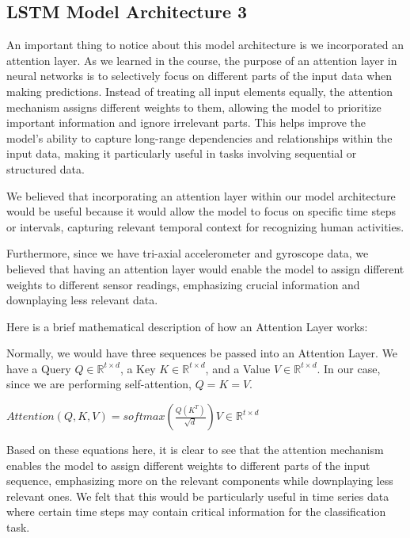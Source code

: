 \documentclass[11pt]{article}
\begin{document}
\subsection{LSTM Model Architecture 3}
An important thing to notice about this model architecture is we incorporated an attention layer. As we learned in the course, the purpose of an attention layer in neural networks is to selectively focus on different parts of the input data when making predictions. Instead of treating all input elements equally, the attention mechanism assigns different weights to them, allowing the model to prioritize important information and ignore irrelevant parts. This helps improve the model's ability to capture long-range dependencies and relationships within the input data, making it particularly useful in tasks involving sequential or structured data. \newline 

We believed that incorporating an attention layer within our model architecture would be useful because it would allow the model to focus on specific time steps or intervals, capturing relevant temporal context for recognizing human activities. \newline 

Furthermore, since we have tri-axial accelerometer and gyroscope data, we believed that having an attention layer would enable the model to assign different weights to different sensor readings, emphasizing crucial information and downplaying less relevant data. \newline 

Here is a brief mathematical description of how an Attention Layer works: \newline 

Normally, we would have three sequences be passed into an Attention Layer. We have a Query $Q \in \mathbb{R}^{t \times d}$, a Key $K \in \mathbb{R}^{t \times d}$, and a Value $V \in \mathbb{R}^{t \times d}$. In our case, since we are performing self-attention, $Q = K = V$. \newline 

$Attention(Q, K, V) = softmax(\frac{Q (K^T)}{\sqrt{d}}) V \in \mathbb{R}^{t \times d}$ \newline 

Based on these equations here, it is clear to see that the attention mechanism enables the model to assign different weights to different parts of the input sequence, emphasizing more on the relevant components while downplaying less relevant ones. We felt that this would be particularly useful in time series data where certain time steps may contain critical information for the classification task. \newline 
\end{document}
